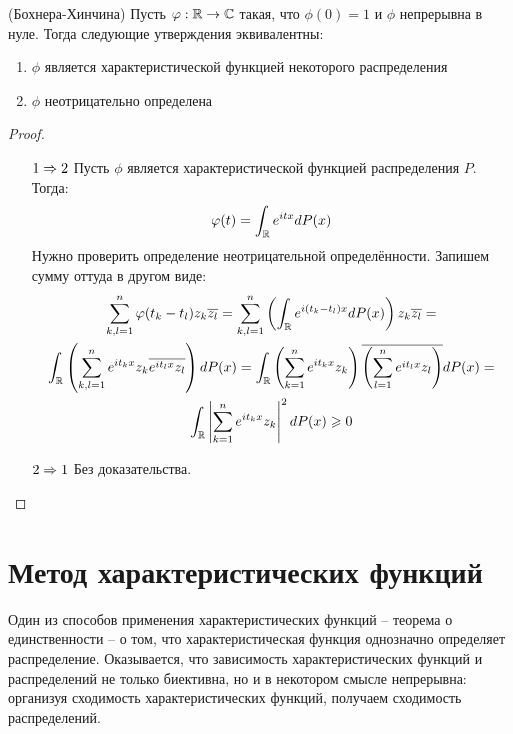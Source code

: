 \begin{theorem} (Бохнера-Хинчина)
    Пусть $\varphi: \mathbb{R} \to \mathbb{C}$ такая, что $\phi(0)=1$ и $\phi$ непрерывна в нуле. Тогда следующие утверждения эквивалентны:
    \begin{enumerate}
        \item $\phi$ является характеристической функцией некоторого распределения
        \item $\phi$ неотрицательно определена
    \end{enumerate}
\end{theorem}

\begin{proof}~
    \begin{itemize}
        \item[$1 \Rightarrow 2$] Пусть $\phi$ является характеристической функцией распределения $P$. Тогда:
        \[
            \varphi(t) = \int_{\mathbb{R}} e^{itx} dP(x)
        \]
        Нужно проверить определение неотрицательной определённости. Запишем сумму оттуда в другом виде:
        \begin{multline*}
            \sum_{k, l = 1}^n \varphi(t_k - t_l) z_k \overline{z_l} = \sum_{k, l = 1}^n \left(\int_{\mathbb{R}} e^{i(t_k - t_l)x} dP(x)\right) z_k \overline{z_l} =
            \\
            \int_{\mathbb{R}} \left(\sum_{k, l = 1}^n e^{it_kx} z_k \overline{e^{it_lx} z_l}\right) dP(x) =
            \int_{\mathbb{R}} \left(\sum_{k=1}^n e^{it_kx}z_k\right) \overline{ \left(\sum_{l=1}^n e^{it_lx}z_l\right)} dP(x) =
            \\
            \int_{\mathbb{R}} \left|\sum_{k=1}^n e^{it_kx}z_k\right|^2 dP(x) \geqslant 0
        \end{multline*}
        
        \item[$2 \Rightarrow 1$] Без доказательства.
    \end{itemize}
\end{proof}

\section{Метод характеристических функций}

\begin{note}
    Один из способов применения характеристических функций -- теорема о единственности -- о том, что характеристическая функция однозначно определяет распределение. Оказывается, что зависимость характеристических функций и распределений не только биективна, но и в некотором смысле непрерывна: организуя сходимость характеристических функций, получаем сходимость распределений.
\end{note}

